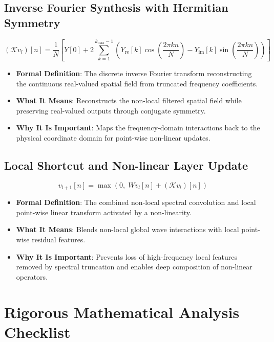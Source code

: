 \documentclass[11pt,a4paper]{article}
\theoremstyle{definition}
\begin{document}
\subsection{Inverse Fourier Synthesis with Hermitian Symmetry}
{\boldmath
\begin{equation}
(\mathcal{K} v_l)[n] = \frac{1}{N} \left[ Y[0] + 2 \sum_{k=1}^{k_{\max}-1} \left( Y_{\text{re}}[k] \cos\left(\frac{2\pi k n}{N}\right) - Y_{\text{im}}[k] \sin\left(\frac{2\pi k n}{N}\right) \right) \right]
\end{equation}
}
\begin{itemize}
    \item \textbf{Formal Definition}: The discrete inverse Fourier transform reconstructing the continuous real-valued spatial field from truncated frequency coefficients.
    \item \textbf{What It Means}: Reconstructs the non-local filtered spatial field while preserving real-valued outputs through conjugate symmetry.
    \item \textbf{Why It Is Important}: Maps the frequency-domain interactions back to the physical coordinate domain for point-wise non-linear updates.
\end{itemize}

\subsection{Local Shortcut and Non-linear Layer Update}
{\boldmath
\begin{equation}
v_{l+1}[n] = \max\left( 0, \; W v_l[n] + (\mathcal{K} v_l)[n] \right)
\end{equation}
}
\begin{itemize}
    \item \textbf{Formal Definition}: The combined non-local spectral convolution and local point-wise linear transform activated by a non-linearity.
    \item \textbf{What It Means}: Blends non-local global wave interactions with local point-wise residual features.
    \item \textbf{Why It Is Important}: Prevents loss of high-frequency local features removed by spectral truncation and enables deep composition of non-linear operators.
\end{itemize}

\section{Rigorous Mathematical Analysis Checklist}
\end{document}
